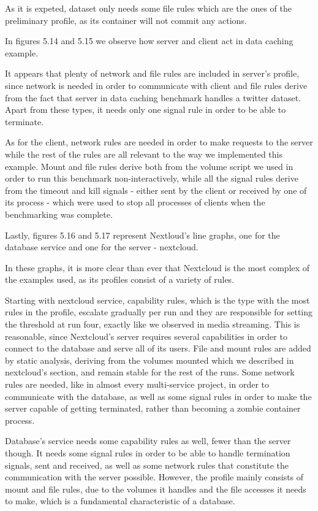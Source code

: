 As it is expeted, dataset only needs some file rules which are the ones of the preliminary profile, as its container will not commit any actions.

In figures 5.14 and 5.15 we observe how server and client act in data caching example. 

It appears that plenty of network and file rules are included in server's profile, since network is needed in order to communicate with client and file rules derive from the fact that server in data caching benchmark handles a twitter dataset. Apart from these types, it needs only one signal rule in order to be able to terminate.

As for the client, network rules are needed in order to make requests to the server while the rest of the rules are all relevant to the way we implemented this example. Mount and file rules derive both from the volume script we used in order to run this benchmark non-interactively, while all the signal rules derive from the timeout and kill signals - either sent by the client or received by one of its process - which were used to stop all processes of clients when the benchmarking was complete.

Lastly, figures 5.16 and 5.17 represent Nextloud's line graphs, one for the database service and one for the server - nextcloud.

In these graphs, it is more clear than ever that Nextcloud is the most complex of the examples used, as its profiles consist of a variety of rules. 

Starting with nextcloud service, capability rules, which is the type with the most rules in the profile, escalate gradually per run and they are responsible for setting the threshold at run four, exactly like we observed in media streaming. This is reasonable, since Nextcloud's server requires several capabilities in order to connect to the database and serve all of its users.  File and mount rules are added by static analysis, deriving from the volumes mounted which we described in nextcloud's section, and remain stable for the rest of the runs. Some network rules are needed, like in almost every multi-service project, in order to communicate with the database, as well as some signal rules in order to make the server capable of getting terminated, rather than becoming a zombie container process.

Database's service needs some capability rules as well, fewer than the server though. It needs some signal rules in order to be able to handle termination signals, sent and received, as well as some network rules that constitute the communication with the server possible. However, the profile mainly consists of mount and file rules, due to the volumes it handles and the file accesses it needs to make, which is a fundamental characteristic of a database.
 
